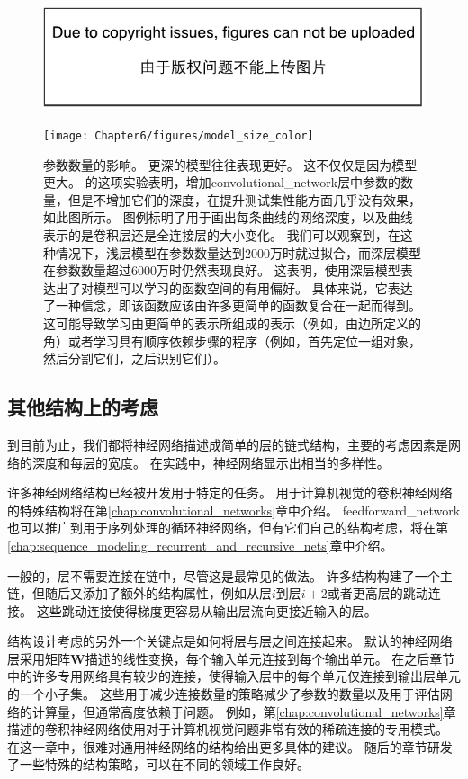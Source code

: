 \begin{figure}[!htb]
\ifOpenSource
\centerline{\includegraphics{figure.pdf}}
\else
\centerline{\texttt{[image: Chapter6/figures/model\_size\_color]}}
\fi
\caption{参数数量的影响。
更深的模型往往表现更好。
这不仅仅是因为模型更大。
\cite{Goodfellow+et+al-ICLR2014a}的这项实验表明，增加\gls{convolutional_network}层中参数的数量，但是不增加它们的深度，在提升测试集性能方面几乎没有效果，如此图所示。
图例标明了用于画出每条曲线的网络深度，以及曲线表示的是卷积层还是全连接层的大小变化。
我们可以观察到，在这种情况下，浅层模型在参数数量达到2000万时就过拟合，而深层模型在参数数量超过6000万时仍然表现良好。
这表明，使用深层模型表达出了对模型可以学习的函数空间的有用偏好。
具体来说，它表达了一种信念，即该函数应该由许多更简单的函数复合在一起而得到。
这可能导致学习由更简单的表示所组成的表示（例如，由边所定义的角）或者学习具有顺序依赖步骤的程序（例如，首先定位一组对象，然后分割它们，之后识别它们）。}
\label{fig:chap6_model_size_color}
\end{figure}

\subsection{其他结构上的考虑}
\label{sec:other_architectural_considerations}

到目前为止，我们都将神经网络描述成简单的层的链式结构，主要的考虑因素是网络的深度和每层的宽度。
在实践中，神经网络显示出相当的多样性。

许多神经网络结构已经被开发用于特定的任务。
用于计算机视觉的卷积神经网络的特殊结构将在第\ref{chap:convolutional_networks}章中介绍。
\gls{feedforward_network}也可以推广到用于序列处理的循环神经网络，但有它们自己的结构考虑，将在第\ref{chap:sequence_modeling_recurrent_and_recursive_nets}章中介绍。


一般的，层不需要连接在链中，尽管这是最常见的做法。
许多结构构建了一个主链，但随后又添加了额外的结构属性，例如从层$i$到层$i+2$或者更高层的跳动连接。
这些跳动连接使得梯度更容易从输出层流向更接近输入的层。

结构设计考虑的另外一个关键点是如何将层与层之间连接起来。
默认的神经网络层采用矩阵$\bm{W}$描述的线性变换，每个输入单元连接到每个输出单元。
在之后章节中的许多专用网络具有较少的连接，使得输入层中的每个单元仅连接到输出层单元的一个小子集。
这些用于减少连接数量的策略减少了参数的数量以及用于评估网络的计算量，但通常高度依赖于问题。
例如，第\ref{chap:convolutional_networks}章描述的卷积神经网络使用对于计算机视觉问题非常有效的稀疏连接的专用模式。
在这一章中，很难对通用神经网络的结构给出更多具体的建议。
随后的章节研发了一些特殊的结构策略，可以在不同的领域工作良好。


